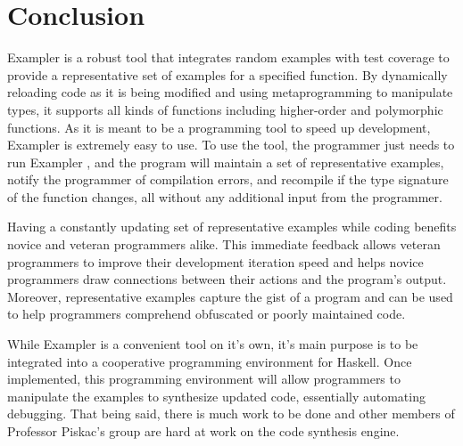 \section{Conclusion}

Exampler is a robust tool that integrates random examples with test coverage to provide a representative set of examples for a specified function.
By dynamically reloading code as it is being modified and using metaprogramming to manipulate types, it supports all kinds of functions including higher-order and polymorphic functions.
As it is meant to be a programming tool to speed up development, Exampler is extremely easy to use.
To use the tool, the programmer just needs to run Exampler 
%
%
, and the program will maintain a set of representative examples, notify the programmer of compilation errors, and recompile if the type signature of the function changes, all without any additional input from the programmer.

Having a constantly updating set of representative examples while coding benefits novice and veteran programmers alike.
This immediate feedback allows veteran programmers to improve their development iteration speed and helps novice programmers draw connections between their actions and the program's output.
Moreover, representative examples capture the gist of a program and can be used to help programmers comprehend obfuscated or poorly maintained code.

While Exampler is a convenient tool on it's own, it's main purpose is to be integrated into a cooperative programming environment for Haskell.
Once implemented, this programming environment will allow programmers to manipulate the examples to synthesize updated code, essentially automating debugging.
That being said, there is much work to be done and other members of Professor Piskac's group are hard at work on the code synthesis engine.
